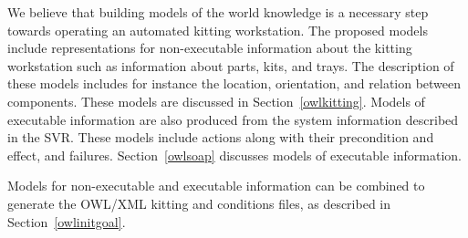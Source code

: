 We believe that building models of the world knowledge is a necessary step towards operating an automated kitting workstation. The proposed models include representations for non-executable information about the kitting workstation such as information about parts, kits, and trays. The description of these models includes for instance the location, orientation, and relation between components. These models are discussed in Section~\ref{owlkitting}. Models of executable information are also produced from the system information described in the SVR. These models include actions along with their precondition and effect, and failures. Section~\ref{owlsoap} discusses models of executable information.

Models for non-executable and executable information can be combined to generate the OWL/XML kitting  and  conditions files, as described in Section~\ref{owlinitgoal}.

